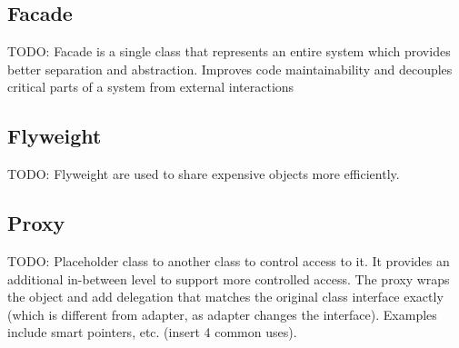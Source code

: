 \begin{multicols}{2}
\subsection{Facade}
TODO: Facade is a single class that represents an entire system which provides better separation and abstraction. Improves code maintainability and decouples critical parts of a system from external interactions

\subsection{Flyweight}
TODO: Flyweight are used to share expensive objects more efficiently. 

\subsection{Proxy}
TODO: Placeholder class to another class to control access to it. It provides an additional in-between level to support more controlled access. The proxy wraps the object and add delegation that matches the original class interface exactly (which is different from adapter, as adapter changes the interface). Examples include smart pointers, etc. (insert 4 common uses).


\iftwocolumns
\end{multicols}
\fi